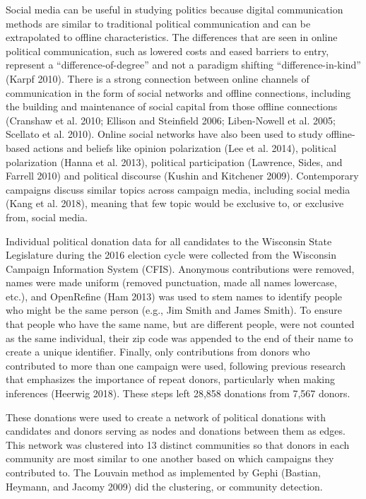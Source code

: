 \documentclass[12pt,]{article}
\begin{document}
Social media can be useful in studying politics because digital
communication methods are similar to traditional political communication
and can be extrapolated to offline characteristics. The differences that
are seen in online political communication, such as lowered costs and
eased barriers to entry, represent a ``difference-of-degree'' and not a
paradigm shifting ``difference-in-kind'' (Karpf 2010). There is a strong
connection between online channels of communication in the form of
social networks and offline connections, including the building and
maintenance of social capital from those offline connections (Cranshaw
et al. 2010; Ellison and Steinfield 2006; Liben-Nowell et al. 2005;
Scellato et al. 2010). Online social networks have also been used to
study offline-based actions and beliefs like opinion polarization (Lee
et al. 2014), political polarization (Hanna et al. 2013), political
participation (Lawrence, Sides, and Farrell 2010) and political
discourse (Kushin and Kitchener 2009). Contemporary campaigns discuss
similar topics across campaign media, including social media (Kang et
al. 2018), meaning that few topic would be exclusive to, or exclusive
from, social media.

Individual political donation data for all candidates to the Wisconsin
State Legislature during the 2016 election cycle were collected from the
Wisconsin Campaign Information System (CFIS). Anonymous contributions
were removed, names were made uniform (removed punctuation, made all
names lowercase, etc.), and OpenRefine (Ham 2013) was used to stem names
to identify people who might be the same person (e.g., Jim Smith and
James Smith). To ensure that people who have the same name, but are
different people, were not counted as the same individual, their zip
code was appended to the end of their name to create a unique
identifier. Finally, only contributions from donors who contributed to
more than one campaign were used, following previous research that
emphasizes the importance of repeat donors, particularly when making
inferences (Heerwig 2018). These steps left 28,858 donations from 7,567
donors.

These donations were used to create a network of political donations
with candidates and donors serving as nodes and donations between them
as edges. This network was clustered into 13 distinct communities so
that donors in each community are most similar to one another based on
which campaigns they contributed to. The Louvain method as implemented
by Gephi (Bastian, Heymann, and Jacomy 2009) did the clustering, or
community detection.
\end{document}
